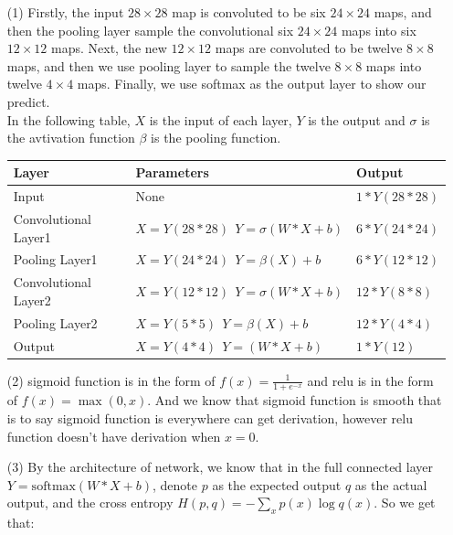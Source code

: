 \begin{solution}
    \begin{enumerate}
        \item[(1)] Firstly, the input $28\times 28$ map is convoluted to be six $24\times 24$ maps, and then the pooling layer sample the convolutional six $24\times 24$ maps into six $12\times 12$ maps. Next, the new $12\times 12$ maps are convoluted to be twelve $8\times 8$ maps, and then we use pooling layer to sample the twelve $8\times 8$ maps into twelve $4\times 4$ maps. Finally, we use softmax as the output layer to show our predict.\\
            In the following table, $X$ is the input of each layer, $Y$ is the output and $\sigma$ is the avtivation function $\beta$ is the pooling function.
            \begin{table}[H]
                \begin{center}
                    \begin{tabular}{|l|l|l|}
                        \hline
                        Layer & Parameters & Output \\ \hline
                        Input & None & $1*Y(28*28)$ \\ \hline
                        Convolutional Layer1 & $X=Y(28*28)~~Y=\sigma(W*X+b)$ & $6*Y(24*24)$\\ \hline
                        Pooling Layer1 & $X=Y(24*24)~~Y=\beta(X)+b$ & $6*Y(12*12)$\\ \hline
                        Convolutional Layer2 & $X=Y(12*12)~~Y=\sigma(W*X+b)$ & $12*Y(8*8)$\\ \hline
                        Pooling Layer2 & $X=Y(5*5)~~Y=\beta(X)+b$ & $12*Y(4*4)$\\ \hline
                        Output & $X=Y(4*4)~~Y=(W*X+b)$& $1*Y(12)$\\ \hline
                    \end{tabular}
                \end{center}
            \end{table}
        \item[(2)] sigmoid function is in the form of $f(x)=\frac{1}{1+e^{-x}}$ and relu is in the form of $f(x)=\max(0,x)$. And we know that sigmoid function is smooth that is to say sigmoid function is everywhere can get derivation, however relu function doesn't have derivation when $x=0$.
        \item[(3)] By the architecture of network, we know that in the full connected layer $Y = \mathrm{softmax}(W*X+b)$, denote $p$ as the expected output $q$ as the actual output, and the cross entropy $H(p,q)=-\sum_{x}p(x)\log q(x)$. So we get that:

\end{enumerate}
\end{solution}
